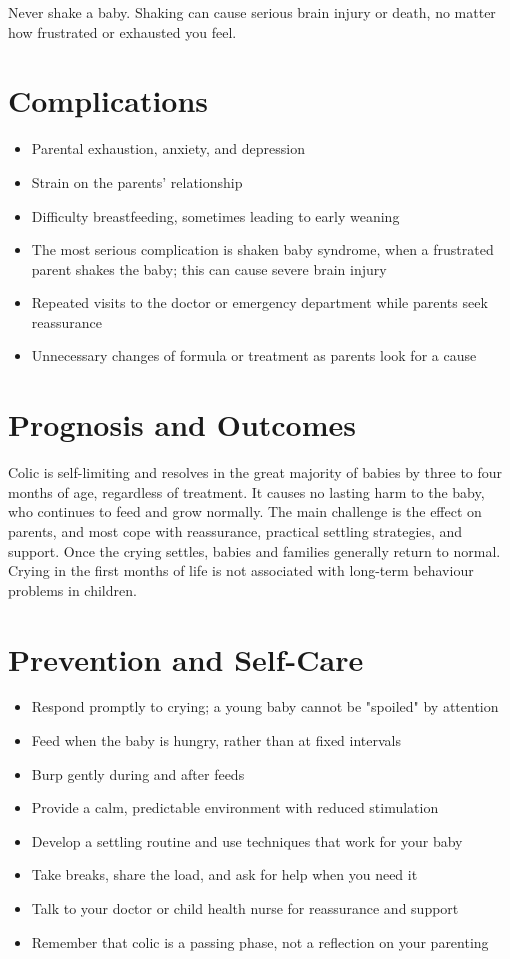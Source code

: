 Never shake a baby. Shaking can cause serious brain injury or death, no matter how frustrated or exhausted you feel.

\section*{Complications}
\begin{itemize}
    \item Parental exhaustion, anxiety, and depression
    \item Strain on the parents' relationship
    \item Difficulty breastfeeding, sometimes leading to early weaning
    \item The most serious complication is shaken baby syndrome, when a frustrated parent shakes the baby; this can cause severe brain injury
    \item Repeated visits to the doctor or emergency department while parents seek reassurance
    \item Unnecessary changes of formula or treatment as parents look for a cause
\end{itemize}

\section*{Prognosis and Outcomes}
Colic is self-limiting and resolves in the great majority of babies by three to four months of age, regardless of treatment. It causes no lasting harm to the baby, who continues to feed and grow normally. The main challenge is the effect on parents, and most cope with reassurance, practical settling strategies, and support. Once the crying settles, babies and families generally return to normal. Crying in the first months of life is not associated with long-term behaviour problems in children.

\section*{Prevention and Self-Care}
\begin{itemize}
    \item Respond promptly to crying; a young baby cannot be "spoiled" by attention
    \item Feed when the baby is hungry, rather than at fixed intervals
    \item Burp gently during and after feeds
    \item Provide a calm, predictable environment with reduced stimulation
    \item Develop a settling routine and use techniques that work for your baby
    \item Take breaks, share the load, and ask for help when you need it
    \item Talk to your doctor or child health nurse for reassurance and support
    \item Remember that colic is a passing phase, not a reflection on your parenting
\end{itemize}

